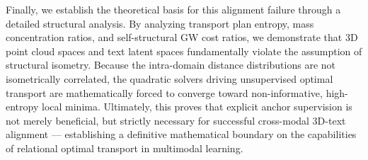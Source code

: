 Finally, we establish the theoretical basis for this alignment failure through a detailed structural analysis. By analyzing transport plan entropy, mass concentration ratios, and self-structural GW cost ratios, we demonstrate that 3D point cloud spaces and text latent spaces fundamentally violate the assumption of structural isometry. Because the intra-domain distance distributions are not isometrically correlated, the quadratic solvers driving unsupervised optimal transport are mathematically forced to converge toward non-informative, high-entropy local minima. Ultimately, this proves that explicit anchor supervision is not merely beneficial, but strictly necessary for successful cross-modal 3D-text alignment --- establishing a definitive mathematical boundary on the capabilities of relational optimal transport in multimodal learning.

\endgroup
\vfill